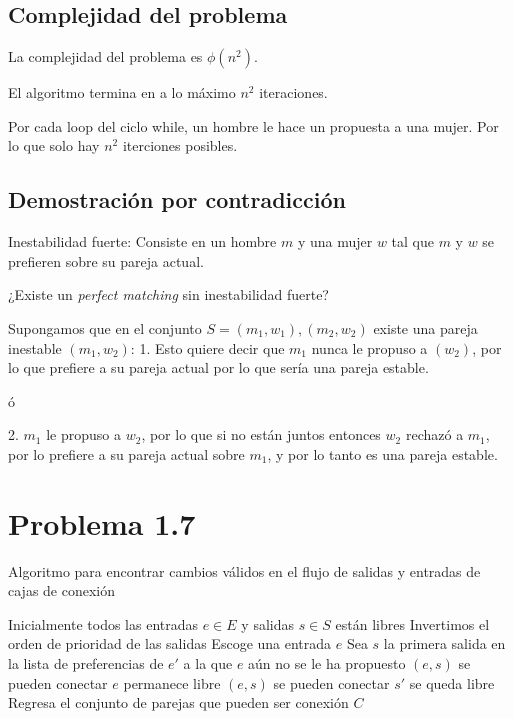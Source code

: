 \documentclass{article}
\begin{document}
\subsection*{Complejidad del problema}
La complejidad del problema es $\phi(n^2)$.
    
El algoritmo termina en a lo máximo $n^2$ iteraciones.
    
Por cada loop del ciclo while, un hombre le hace un propuesta a una mujer. Por
lo que solo hay $n^2$ iterciones posibles. 
    
\subsection*{Demostración por contradicción}

Inestabilidad fuerte: Consiste en un hombre $m$ y una mujer $w$ tal que $m$ y
$w$ se prefieren sobre su pareja actual.
    
¿Existe un \textit{perfect matching} sin inestabilidad fuerte?
    
Supongamos que en el conjunto $S = {(m_1,w_1),(m_2,w_2)}$ existe una pareja
inestable $(m_1,w_2)$:
1. Esto quiere decir que $m_1$ nunca le propuso a $(w_2)$, por lo que prefiere a
su pareja actual por lo que sería una pareja estable.

ó 

2. $m_1$ le propuso a $w_2$, por lo que si no están juntos entonces $w_2$
rechazó a $m_1$, por lo prefiere a su pareja actual sobre $m_1$, y por lo
tanto es una pareja estable.

\section*{Problema 1.7}

\begin{algorithm}
\caption{Algoritmo para encontrar cambios válidos en el flujo de salidas y
entradas de cajas de conexión}\label{alg:cap}
    \begin{algorithmic}
        \Require Inicialmente todos las entradas $e \in E$ y salidas $s \in S$ están libres
        \Require Invertimos el orden de prioridad de las salidas
        \State Escoge una entrada $e$
        \State Sea $s$ la primera salida en la lista de preferencias de $e'$ a
        la que $e$ aún no se le ha propuesto
            \State $(e,s)$ se pueden conectar
                \State $e$ permanece libre
                \State $(e,s)$ se pueden conectar
                \State $s'$ se queda libre
            \EndIf
        \EndIf
    \EndWhile
    \State Regresa el conjunto de parejas que pueden ser conexión $C$
    \end{algorithmic}
\end{algorithm}
\end{document}
